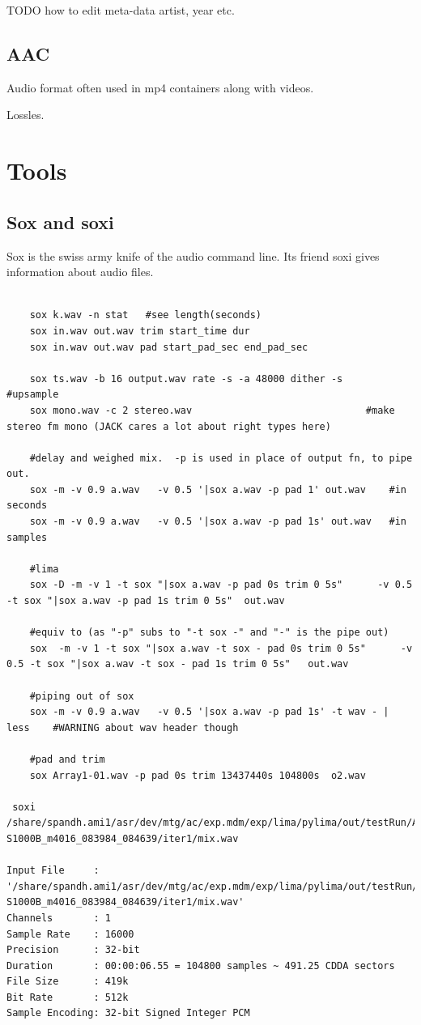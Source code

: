\documentclass[oneside,english]{scrbook}
\begin{document}
TODO how to edit meta-data artist, year etc.

\section{AAC}
Audio format often used in mp4 containers along with videos.

Lossles.

\chapter{Tools}
\section{Sox and soxi}
Sox is the swiss army knife of the audio command line. Its friend soxi gives information about audio files.
\begin{lstlisting}

	sox k.wav -n stat   #see length(seconds)
	sox in.wav out.wav trim start_time dur			
	sox in.wav out.wav pad start_pad_sec end_pad_sec

	sox ts.wav -b 16 output.wav rate -s -a 48000 dither -s    #upsample
	sox mono.wav -c 2 stereo.wav                              #make stereo fm mono (JACK cares a lot about right types here)

	#delay and weighed mix.  -p is used in place of output fn, to pipe out.
	sox -m -v 0.9 a.wav   -v 0.5 '|sox a.wav -p pad 1' out.wav    #in seconds
	sox -m -v 0.9 a.wav   -v 0.5 '|sox a.wav -p pad 1s' out.wav   #in samples

	#lima
	sox -D -m -v 1 -t sox "|sox a.wav -p pad 0s trim 0 5s"      -v 0.5 -t sox "|sox a.wav -p pad 1s trim 0 5s"  out.wav
 
	#equiv to (as "-p" subs to "-t sox -" and "-" is the pipe out)
	sox  -m -v 1 -t sox "|sox a.wav -t sox - pad 0s trim 0 5s"      -v 0.5 -t sox "|sox a.wav -t sox - pad 1s trim 0 5s"   out.wav
	
	#piping out of sox
	sox -m -v 0.9 a.wav   -v 0.5 '|sox a.wav -p pad 1s' -t wav - | less    #WARNING about wav header though

	#pad and trim
	sox Array1-01.wav -p pad 0s trim 13437440s 104800s  o2.wav

 soxi  /share/spandh.ami1/asr/dev/mtg/ac/exp.mdm/exp/lima/pylima/out/testRun/AMI-S1000B_m4016_083984_084639/iter1/mix.wav

Input File     : '/share/spandh.ami1/asr/dev/mtg/ac/exp.mdm/exp/lima/pylima/out/testRun/AMI-S1000B_m4016_083984_084639/iter1/mix.wav'
Channels       : 1
Sample Rate    : 16000
Precision      : 32-bit
Duration       : 00:00:06.55 = 104800 samples ~ 491.25 CDDA sectors
File Size      : 419k
Bit Rate       : 512k
Sample Encoding: 32-bit Signed Integer PCM

\end{lstlisting}
\end{document}
